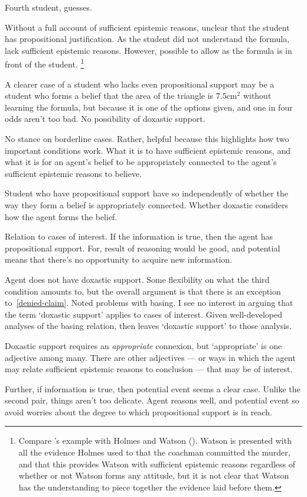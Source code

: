 \begin{note}[P/D Example]
  Fourth student, guesses.

  Without a full account of sufficient epistemic reasons, unclear that the student has propositional justification.
  As the student did not understand the formula, lack sufficient epistemic reasons.
  However, possible to allow as the formula is in front of the student.\nolinebreak
  \footnote{Compare \citeauthor{Firth:1978vi}'s example with Holmes and Watson (\citeyear[218]{Firth:1978vi}).
    Watson is presented with all the evidence Holmes used to that the coachman committed the murder, and that this provides Watson with sufficient epistemic reasons regardless of whether or not Watson forms any attitude, but it is not clear that Watson has the understanding to piece together the evidence laid before them.}

  A clearer case of a student who lacks even propositional support may be a student who forms a belief that the area of the triangle is \(7.5\text{cm}^{2}\) without learning the formula, but because it is one of the options given, and one in four odds aren't too bad.
  No possibility of doxastic support.

  No stance on borderline cases.
  Rather, helpful because this highlights how two important conditions work.
  What it is to have sufficient epistemic reasons, and what it is for an agent's belief to be appropriately connected to the agent's sufficient epistemic reasons to believe.
\end{note}

\begin{note}[Takeaway]
  Student who have propositional support have so independently of whether the way they form a belief is appropriately connected.
  Whether doxastic considers how the agent forms the belief.

  Relation to cases of interest.
  If the information is true, then the agent has propositional support.
  For, result of reasoning would be good, and potential means that there's no opportunity to acquire new information.

  Agent does not have doxastic support.
  Some flexibility on what the third condition amounts to, but the overall argument is that there is an exception to~\ref{denied-claim}.
  Noted problems with basing.
  I see no interest in arguing that the term `doxastic support' applies to cases of interest.
  Given well-developed analyses of the basing relation, then leaves `doxastic support' to those analysis.

  Doxastic support requires an \emph{appropriate} connexion, but `appropriate' is one adjective among many.
  There are other adjectives --- or ways in which the agent may relate sufficient epistemic reasons to conclusion --- that may be of interest.

  Further, if information is true, then potential event seems a clear case.
  Unlike the second pair, things aren't too delicate.
  Agent reasons well, and potential event so avoid worries about the degree to which propositional support is in reach.
\end{note}

